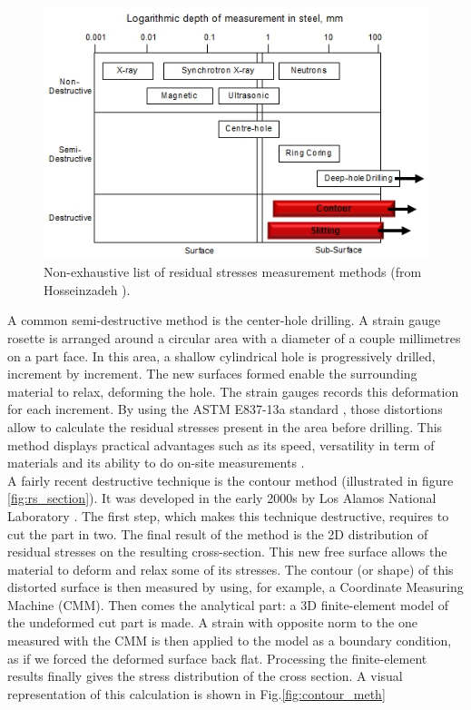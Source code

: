 \begin{figure}[ht]
	\centering
	\includegraphics[scale=0.80]{Images/rs_measure}
	\decoRule
	\caption[Non-exhaustive list of residual stresses measurement methods.]{Non-exhaustive list of residual stresses measurement methods (from Hosseinzadeh \parencite{Openuni}).}
	\label{fig:rs_measure}
\end{figure}

A common semi-destructive method is the center-hole drilling. A strain gauge rosette is arranged around a circular area with a diameter of a couple millimetres on a part face. In this area, a shallow cylindrical hole is progressively drilled, increment by increment. The new surfaces formed enable the surrounding material to relax, deforming the hole. The strain gauges records this deformation for each increment. By using the ASTM E837-13a standard \cite{ASTM}, those distortions allow to calculate the residual stresses present in the area before drilling. This method displays practical advantages such as its speed, versatility in term of materials and its ability to do on-site measurements \cite{G2MT}. \\

A fairly recent destructive technique is the contour method (illustrated in figure \ref{fig:rs_section}). It was developed in the early 2000s by Los Alamos National Laboratory \cite{LANL}. The first step, which makes this technique destructive, requires to cut the part in two. The final result of the method is the 2D distribution of residual stresses on the resulting cross-section. This new free surface allows the material to deform and relax some of its stresses. The contour (or shape) of this distorted surface is then measured by using, for example, a Coordinate Measuring Machine (CMM). Then comes the analytical part: a 3D finite-element model of the undeformed cut part is made. A strain with opposite norm to the one measured with the CMM is then applied to the model as a boundary condition, as if we forced the deformed surface back flat. Processing the finite-element results finally gives the stress distribution of the cross section. A visual representation of this calculation is shown in Fig.\ref{fig:contour_meth}\\

